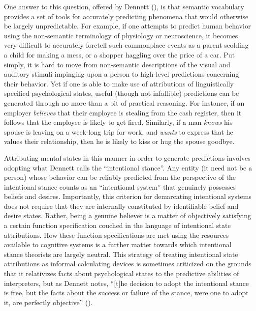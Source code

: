 One answer to this question, offered by Dennett (\citeyear{Dennett:1991,Dennett:1987}), is that semantic vocabulary provides a set of tools for accurately predicting phenomena that would otherwise be largely unpredictable. For example, if one attempts to predict human behavior using the non-semantic terminology of physiology or neuroscience, it becomes very difficult to accurately foretell such commonplace events as a parent scolding a child for making a mess, or a shopper haggling over the price of a car. Put simply, it is hard to move from non-semantic descriptions of the visual and auditory stimuli impinging upon a person to high-level predictions concerning their behavior. Yet if one is able to make use of attributions of linguistically specified psychological states, useful (though not infallible) predictions can be generated through no more than a bit of practical reasoning. For instance, if an employer \textit{believes} that their employee is stealing from the cash register, then it follows that the employee is likely to get fired. Similarly, if a man \textit{knows} his spouse is leaving on a week-long trip for work, and \textit{wants} to express that he values their relationship, then he is likely to kiss or hug the spouse goodbye. 

Attributing mental states in this manner in order to generate predictions involves adopting what Dennett calls the ``intentional stance''. Any entity (it need not be a person) whose behavior can be reliably predicted from the perspective of the intentional stance counts as an ``intentional system'' that genuinely possesses beliefs and desires. Importantly, this criterion for demarcating intentional systems does not require that they are internally constituted by identifiable belief and desire states. Rather, being a genuine believer is a matter of objectively satisfying a certain function specification couched in the language of intentional state attributions. How these function specifications are met using the resources available to cognitive systems is a further matter towards which intentional stance theorists are largely neutral. This strategy of treating intentional state attributions as informal calculating devices is sometimes criticized on the grounds that it relativizes facts about psychological states to the predictive abilities of interpreters, but as Dennett notes, ``[t]he decision to adopt the intentional stance is free, but the facts about the success or failure of the stance, were one to adopt it, are perfectly objective'' (\citeyear[][p. 24]{Dennett:1987}).

